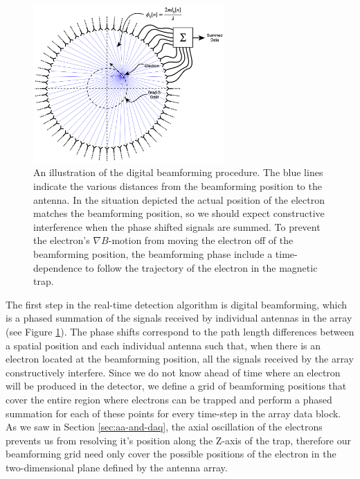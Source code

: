 \begin{figure}[htbp]
    \centering
    \includegraphics[width=0.65\textwidth]{figs/Chapter-4/230216_beamforming_diagram_annotated.001.png}
    \caption{An illustration of the digital beamforming procedure. The blue lines indicate the various distances from the beamforming position to the antenna. In the situation depicted the actual position of the electron matches the beamforming position, so we should expect constructive interference when the phase shifted signals are summed. To prevent the electron's $\nabla B$-motion from moving the electron off of the beamforming position, the beamforming phase include a time-dependence to follow the trajectory of the electron in the magnetic trap.}
    \label{fig:beamforming}
\end{figure}

The first step in the real-time detection algorithm is digital beamforming, which is a phased summation of the signals received by individual antennas in the array (see Figure \ref{fig:beamforming}). The phase shifts correspond to the path length differences between a spatial position and each individual antenna such that, when there is an electron located at the beamforming position, all the signals received by the array constructively interfere. Since we do not know ahead of time where an electron will be produced in the detector, we define a grid of beamforming positions that cover the entire region where electrons can be trapped and perform a phased summation for each of these points for every time-step in the array data block. As we saw in Section \ref{sec:aa-and-daq}, the axial oscillation of the electrons prevents us from resolving it's position along the Z-axis of the trap, therefore our beamforming grid need only cover the possible positions of the electron in the two-dimensional plane defined by the antenna array. 


